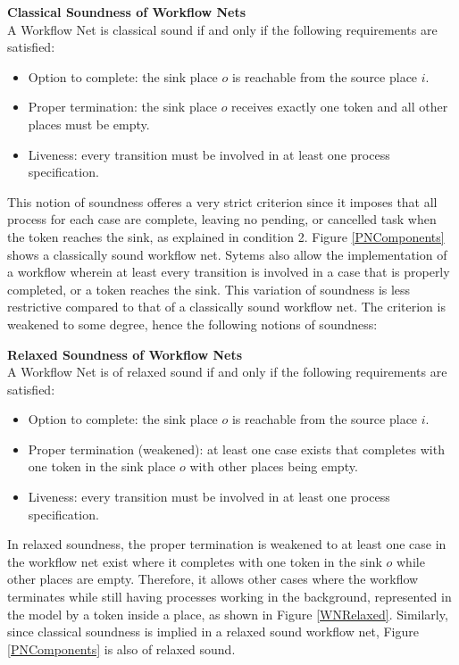 \begin{defn}\textbf{Classical Soundness of Workflow Nets} \cite{Aalst2011}\\
    \label{ClassicalWNDef}
    A Workflow Net is classical sound if and only if the following requirements are satisfied:
    \begin{itemize}
        \item Option to complete: the sink place $ o $ is reachable from the source place $ i $.
        \item Proper termination: the sink place $ o $ receives exactly one token and all other places must be empty.
        \item Liveness: every transition must be involved in at least one process specification.
    \end{itemize}
\end{defn}
This notion of soundness offeres a very strict criterion since it imposes that all process for each case are complete, leaving no pending, or cancelled task when the token reaches the sink, as explained in condition 2. \cite{Malinao2017} Figure \ref{PNComponents} shows a classically sound workflow net.
Sytems also allow the implementation of a workflow wherein at least every transition is involved in a case that is properly completed, or a token reaches the sink. This variation of soundness is less restrictive compared to that of a classically sound workflow net. The criterion is weakened to some degree, hence the following notions of soundness:
\begin{defn}\textbf{Relaxed Soundness of Workflow Nets} \cite{Aalst2011}\\
    \label{RelaxedWNDef}
    A Workflow Net is of relaxed sound if and only if the following requirements are satisfied:
    \begin{itemize}
        \item Option to complete: the sink place $ o $ is reachable from the source place $ i $.
        \item Proper termination (weakened): at least one case exists that completes with one token in the sink place $ o $ with other places being empty.
        \item Liveness: every transition must be involved in at least one process specification.
    \end{itemize}
\end{defn}

In relaxed soundness, the proper termination is weakened to at least one case in the workflow net exist where it completes with one token in the sink $o$ while other places are empty. Therefore, it allows other cases where the workflow terminates while still having processes working in the background, represented in the model by a token inside a place, as shown in Figure \ref{WNRelaxed}. Similarly, since classical soundness is implied in a relaxed sound workflow net, Figure \ref{PNComponents} is also of relaxed sound.

